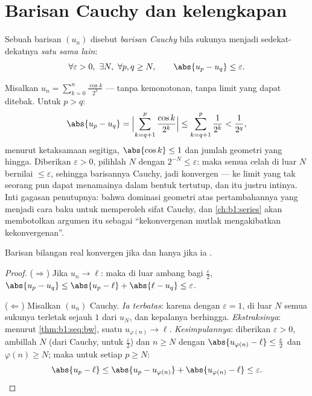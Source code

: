 \section{Barisan Cauchy dan kelengkapan}

\begin{definition}\label{def:b1:seq:cauchy}
Sebuah barisan $(u_n)$ disebut \emph{barisan Cauchy}
bila sukunya menjadi sedekat-dekatnya \emph{satu sama lain}:
\[
\forall \varepsilon > 0,\ \exists N,\ \forall p, q \geq N,
\qquad \abs{u_p - u_q} \leq \varepsilon .
\]
\end{definition}

\begin{example}\label{ex:b1:seq:cauchyhand}
Misalkan $u_n = \sum_{k=0}^{n} \frac{\cos k}{2^k}$ --- tanpa kemonotonan,
tanpa limit yang dapat ditebak. Untuk $p > q$:
\[
\abs{u_p - u_q}
= \Bigl| \sum_{k=q+1}^{p} \frac{\cos k}{2^k} \Bigr|
\leq \sum_{k=q+1}^{p} \frac{1}{2^k}
< \frac{1}{2^{q}} ,
\]
menurut ketaksamaan segitiga, $\abs{\cos k} \leq 1$ dan jumlah geometri
yang hingga. Diberikan $\varepsilon > 0$, pilihlah $N$ dengan $2^{-N}
\leq \varepsilon$: maka semua celah di luar $N$ bernilai $\leq \varepsilon$,
sehingga barisannya Cauchy, jadi konvergen --- ke limit yang tak seorang pun
dapat menamainya dalam bentuk tertutup, dan itu justru intinya. Inti gagasan
penutupnya: bahwa dominasi geometri atas pertambahannya yang menjadi cara baku
untuk memperoleh sifat Cauchy, dan \cref{ch:b1:series} akan
membotolkan argumen itu sebagai ``kekonvergenan mutlak mengakibatkan
kekonvergenan''.
\end{example}

\begin{theorem}[Kelengkapan $\R$]\label{thm:b1:seq:complete}
Barisan bilangan real konvergen jika dan hanya jika ia .
\end{theorem}

\begin{proof}
($\Rightarrow$) Jika $u_n \to \ell$: maka di luar ambang bagi
$\frac\varepsilon2$, $\abs{u_p - u_q} \leq \abs{u_p - \ell} +
\abs{\ell - u_q} \leq \varepsilon$.

($\Leftarrow$) Misalkan $(u_n)$ Cauchy. \emph{Ia terbatas}: karena dengan
$\varepsilon = 1$, di luar $N$ semua sukunya terletak sejauh $1$ dari $u_N$, dan
kepalanya berhingga. \emph{Ekstraksinya}: menurut
\cref{thm:b1:seq:bw}, suatu  $u_{\varphi(n)} \to \ell$.
\emph{Kesimpulannya}: diberikan $\varepsilon > 0$, ambillah $N$ (dari Cauchy, untuk
$\frac\varepsilon2$) dan $n \geq N$ dengan $\abs{u_{\varphi(n)} - \ell}
\leq \frac\varepsilon2$ dan $\varphi(n) \geq N$; maka untuk setiap $p
\geq N$:
\[
\abs{u_p - \ell} \leq \abs{u_p - u_{\varphi(n)}} +
\abs{u_{\varphi(n)} - \ell} \leq \varepsilon . \qedhere
\]
\end{proof}

